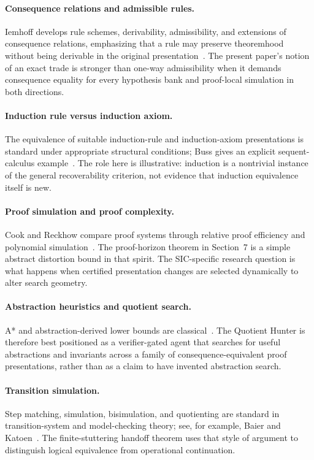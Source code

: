 \documentclass[11pt]{article}
\theoremstyle{definition}
\theoremstyle{remark}
\begin{document}
\paragraph{Consequence relations and admissible rules.}
Iemhoff develops rule schemes, derivability, admissibility, and extensions of consequence relations, emphasizing that a rule may preserve theoremhood without being derivable in the original presentation~\cite{Iemhoff2016}. The present paper's notion of an exact trade is stronger than one-way admissibility when it demands consequence equality for every hypothesis bank and proof-local simulation in both directions.

\paragraph{Induction rule versus induction axiom.}
The equivalence of suitable induction-rule and induction-axiom presentations is standard under appropriate structural conditions; Buss gives an explicit sequent-calculus example~\cite{Buss1998}. The role here is illustrative: induction is a nontrivial instance of the general recoverability criterion, not evidence that induction equivalence itself is new.

\paragraph{Proof simulation and proof complexity.}
Cook and Reckhow compare proof systems through relative proof efficiency and polynomial simulation~\cite{CookReckhow1979}. The proof-horizon theorem in Section~7 is a simple abstract distortion bound in that spirit. The SIC-specific research question is what happens when certified presentation changes are selected dynamically to alter search geometry.

\paragraph{Abstraction heuristics and quotient search.}
A* and abstraction-derived lower bounds are classical~\cite{Hart1968,MostowPrieditis1989,Holte1996}. The Quotient Hunter is therefore best positioned as a verifier-gated agent that searches for useful abstractions and invariants across a family of consequence-equivalent proof presentations, rather than as a claim to have invented abstraction search.

\paragraph{Transition simulation.}
Step matching, simulation, bisimulation, and quotienting are standard in transition-system and model-checking theory; see, for example, Baier and Katoen~\cite{BaierKatoen2008}. The finite-stuttering handoff theorem uses that style of argument to distinguish logical equivalence from operational continuation.
\end{document}

